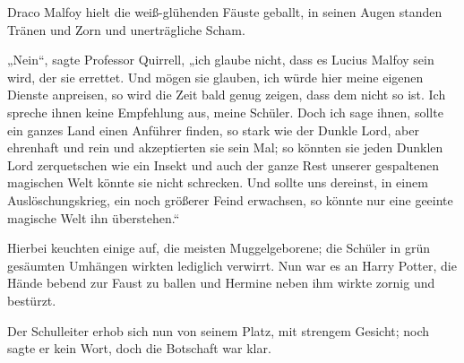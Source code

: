 Draco Malfoy hielt die weiß-glühenden Fäuste geballt, in seinen Augen standen Tränen und Zorn und unerträgliche Scham.

„Nein“, sagte Professor Quirrell, „ich glaube nicht, dass es Lucius Malfoy sein wird, der sie errettet. Und mögen sie glauben, ich würde hier meine eigenen Dienste anpreisen, so wird die Zeit bald genug zeigen, dass dem nicht so ist. Ich spreche ihnen keine Empfehlung aus, meine Schüler. Doch ich sage ihnen, sollte ein ganzes Land einen Anführer finden, so stark wie der Dunkle Lord, aber ehrenhaft und rein und akzeptierten sie sein Mal; so könnten sie jeden Dunklen Lord zerquetschen wie ein Insekt und auch der ganze Rest unserer gespaltenen magischen Welt könnte sie nicht schrecken. Und sollte uns dereinst, in einem Auslöschungskrieg, ein noch größerer Feind erwachsen, so könnte nur eine geeinte magische Welt ihn überstehen.“

Hierbei keuchten einige auf, die meisten Muggelgeborene; die Schüler in grün gesäumten Umhängen wirkten lediglich verwirrt. Nun war es an Harry Potter, die Hände bebend zur Faust zu ballen und Hermine neben ihm wirkte zornig und bestürzt.

Der Schulleiter erhob sich nun von seinem Platz, mit strengem Gesicht; noch sagte er kein Wort, doch die Botschaft war klar.

